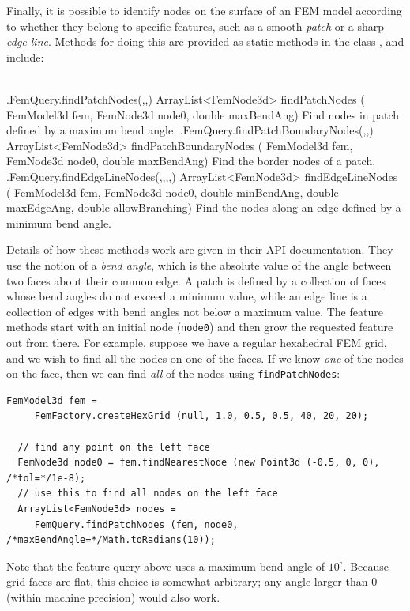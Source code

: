 Finally, it is possible to identify nodes on the surface of an FEM
model according to whether they belong to specific features, such as a
smooth {\it patch} or a sharp {\it edge line}.  Methods for doing this
are provided as static methods in the
class , and include:
%
\begin{methodtable}[4pt]{0.6}{0.4}
\midline
{}\\
\midline
%
\methodentry
{\fem.FemQuery.findPatchNodes(,,)}%
{ArrayList<FemNode3d> findPatchNodes (\brh
FemModel3d fem, FemNode3d node0, double maxBendAng)}%
{Find nodes in patch defined by a maximum bend angle.}%
%
\methodentry
{\fem.FemQuery.findPatchBoundaryNodes(,,)}%
{ArrayList<FemNode3d> findPatchBoundaryNodes (\brh
FemModel3d fem, FemNode3d node0, double maxBendAng)}%
{Find the border nodes of a patch.}%
%
\methodentry
{\fem.FemQuery.findEdgeLineNodes(,,,,)}%
{ArrayList<FemNode3d> findEdgeLineNodes (\brh
FemModel3d fem, FemNode3d node0, double minBendAng, \brh 
double maxEdgeAng, double allowBranching)}%
{Find the nodes along an edge defined by a minimum bend angle.}%
%
\midline
\end{methodtable}
%
Details of how these methods work are given in their API
documentation. They use the notion of a {\it bend angle}, which is the
absolute value of the angle between two faces about their common
edge. A patch is defined by a collection of faces whose bend angles do
not exceed a minimum value, while an edge line is a collection of edges
with bend angles not below a maximum value. The feature methods start
with an initial node ({\tt node0}) and then grow the requested feature
out from there. For example, suppose we have a regular hexahedral FEM
grid, and we wish to find all the nodes on one of the faces. If we
know {\it one} of the nodes on the face, then we can find {\it all} of
the nodes using {\tt findPatchNodes}:
%
\begin{lstlisting}[]
  FemModel3d fem = 
     FemFactory.createHexGrid (null, 1.0, 0.5, 0.5, 40, 20, 20);
      
  // find any point on the left face
  FemNode3d node0 = fem.findNearestNode (new Point3d (-0.5, 0, 0), /*tol=*/1e-8);
  // use this to find all nodes on the left face
  ArrayList<FemNode3d> nodes = 
     FemQuery.findPatchNodes (fem, node0, /*maxBendAngle=*/Math.toRadians(10));
\end{lstlisting}
%
Note that the feature query above uses a maximum bend angle of
$10^\circ$. Because grid faces are flat, this choice is somewhat
arbitrary; any angle larger than 0 (within machine precision) would also
work.

